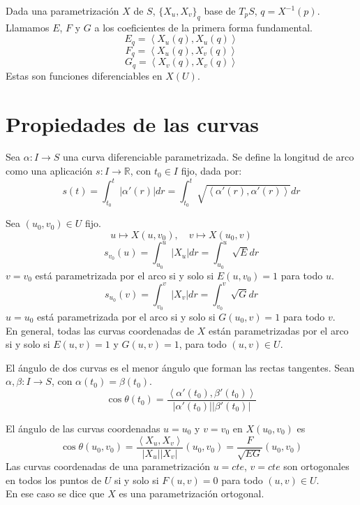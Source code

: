 \begin{note}
    Dada una parametrización $X$ de $S$, $\{ X_u, X_v \}_q$ base de $T_pS$, $q = X^{-1}(p)$.
    Llamamos $E$, $F$ y $G$ a los coeficientes de la primera forma fundamental.
    $$E_q = \left\langle X_u(q), X_u(q) \right\rangle$$
    $$F_q = \left\langle X_u(q), X_v(q) \right\rangle$$
    $$G_q = \left\langle X_v(q), X_v(q) \right\rangle$$
    Estas son funciones diferenciables en $X(U)$.
\end{note}

\section{Propiedades de las curvas}

\begin{definition}
    Sea $\alpha : I \to S$ una curva diferenciable parametrizada.
    Se define la longitud de arco como una aplicación $s : I \to \mathbb{R}$, con $t_0 \in I$ fijo, dada por:
    $$s(t) = \int^t_{t_0} |\alpha'(r)|dr = \int^t_{t_0} \sqrt{\left\langle \alpha'(r), \alpha'(r) \right\rangle} dr$$
\end{definition}

\begin{remark}
    Sea $(u_0, v_0) \in U$ fijo.
    $$u \mapsto X(u, v_0), \quad v \mapsto X(u_0, v)$$
    $$s_{v_0}(u) = \int^u_{u_0} |X_u| dr = \int^u_{u_0} \sqrt{E} dr$$
    $v = v_0$ está parametrizada por el arco si y solo si $E(u, v_0) = 1$ para todo $u$.
    $$s_{u_0}(v) = \int^v_{v_0} |X_v| dr = \int^v_{v_0} \sqrt{G} dr$$
    $u = u_0$ está parametrizada por el arco si y solo si $G(u_0, v) = 1$ para todo $v$.\\
    En general, todas las curvas coordenadas de $X$ están parametrizadas por el arco si y solo si $E(u, v) = 1$ y $G(u, v) = 1$, para todo $(u, v) \in U$.
\end{remark}

\begin{definition}
    El ángulo de dos curvas es el menor ángulo que forman las rectas tangentes.
    Sean $\alpha, \beta : I \to S$, con $\alpha(t_0) = \beta(t_0)$.
    $$\cos \theta(t_0) = \frac{\left\langle \alpha'(t_0), \beta'(t_0) \right\rangle}{|\alpha'(t_0)||\beta'(t_0)|}$$
\end{definition}

\begin{remark}
    El ángulo de las curvas coordenadas $u = u_0$ y $v = v_0$ en $X(u_0, v_0)$ es
    $$\cos \theta(u_0, v_0) = \frac{\left\langle X_u, X_v \right\rangle}{|X_u||X_v|} (u_0, v_0) = \frac{F}{\sqrt{EG}} (u_0, v_0)$$
    Las curvas coordenadas de una parametrización $u = cte$, $v = cte$ son ortogonales en todos los puntos de $U$ si y solo si $F(u, v) = 0$ para todo $(u, v) \in U$.\\
    En ese caso se dice que $X$ es una parametrización ortogonal.
\end{remark}

